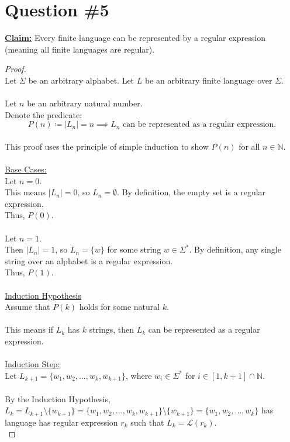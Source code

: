 \documentclass[12pt]{article}
\begin{document}
\section*{Question \#5}
\textbf{\underline{Claim:}} Every finite language can be represented by a regular expression (meaning all finite languages are regular).
\begin{proof}
\leavevmode\\
    Let $\Sigma$ be an arbitrary alphabet. Let $L$ be an arbitrary finite language over $\Sigma$. \\
    \\
    Let $n$ be an arbitrary natural number. \\
    Denote the predicate:
    \[
        P(n) \coloneqq |L_n| = n \implies \text{$L_n$ can be represented as a regular expression.}
    \]
    \\
    This proof uses the principle of simple induction to show $P(n)$ for all $n \in \mathbb{N}$. \\
    \\
    \underline{Base Cases:} \\
    Let $n = 0$. \\
    This means $|L_n| = 0$, so $L_n = \emptyset$. By definition, the empty set is a regular expression. \\
    Thus, $P(0)$. \\
    \\
    Let $n = 1$. \\
    Then $|L_n| = 1$, so $L_n = \{ w \}$ for some string $w \in \Sigma^*$. By definition, any single string over an alphabet is a regular expression. \\
    Thus, $P(1)$. \\
    \\
    \underline{Induction Hypothesis} \\
    Assume that $P(k)$ holds for some natural $k$. \\
    \\
    This means if $L_k$ has $k$ strings, then $L_k$ can be represented as a regular expression. \\
    \\
    \underline{Induction Step:} \\
    Let $L_{k + 1} = \{ w_1, w_2, \dots, w_k, w_{k + 1} \}$, where $w_i \in \Sigma^*$ for $i \in [1, k + 1] \cap \mathbb{N}$. \\
    \\
    By the Induction Hypothesis, $L_k = L_{k + 1} \setminus \{ w_{k + 1} \} = \{ w_1, w_2, \dots, w_k, w_{k + 1} \} \setminus \{ w_{k + 1} \} = \{ w_1, w_2, \dots, w_k \}$ has language has regular expression $r_k$ such that $L_k = \mathcal{L}(r_k)$. \\

\end{proof}
\end{document}

